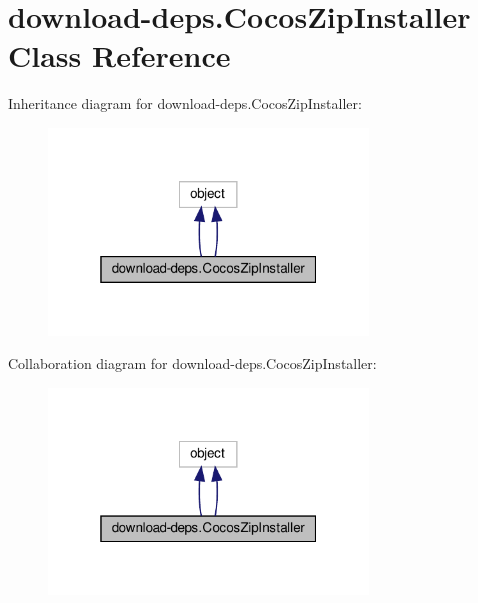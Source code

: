 \hypertarget{classdownload-deps_1_1CocosZipInstaller}{}\section{download-\/deps.Cocos\+Zip\+Installer Class Reference}
\label{classdownload-deps_1_1CocosZipInstaller}


Inheritance diagram for download-\/deps.Cocos\+Zip\+Installer\+:
\nopagebreak
\begin{figure}[H]
\begin{center}
\leavevmode
\includegraphics[width=241pt]{classdownload-deps_1_1CocosZipInstaller__inherit__graph}
\end{center}
\end{figure}


Collaboration diagram for download-\/deps.Cocos\+Zip\+Installer\+:
\nopagebreak
\begin{figure}[H]
\begin{center}
\leavevmode
\includegraphics[width=241pt]{classdownload-deps_1_1CocosZipInstaller__coll__graph}
\end{center}
\end{figure}

